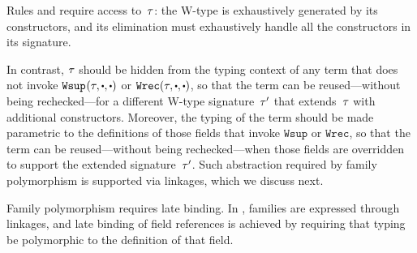



Rules  and  require access to~$\tau$:
the W-type is exhaustively generated by its constructors, and
its elimination must exhaustively handle all the constructors in
its signature.

In contrast, $\tau$ should be hidden from the typing context of any
term that does not invoke $\Wsup{}{\wsig}{\cDot}{\cDot}$ or $\Wrec{\wsig}{\cDot}{\cDot}$, so that
the term can be reused---without being rechecked---for a different
W-type signature~$\tau'$ that extends~$\tau$ with additional
constructors.
Moreover, the typing of the term should be made parametric to
the definitions of those fields that invoke $\texttt{Wsup}$ or $\texttt{Wrec}$,
so that the term can be reused---without being rechecked---when those fields
are overridden to support the extended signature~$\tau'$.
%
Such abstraction required by family polymorphism is supported via linkages,
which we discuss next.



Family polymorphism requires late binding.
In \TT, families are expressed through linkages, and late binding of
field references is achieved by requiring that typing be polymorphic to
the definition of that field.


